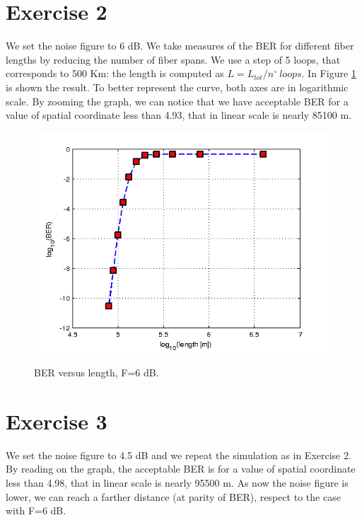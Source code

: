 \documentclass[a4paper,10pt]{report}
\begin{document}
\newpage
\section*{Exercise 2}
We set the noise figure to 6 dB. We take measures of the BER for different fiber lengths by reducing the number of fiber spans.
We use a step of 5 loops, that corresponds to 500 Km: the length is computed as $L=L_{tot}/n^\circ \ loops$.
In Figure \ref{es2} is shown the result. To better represent the curve, both axes are in logarithmic scale.
By zooming the graph, we can notice that we have acceptable BER for a value of spatial coordinate less than 4.93,
that in linear scale is nearly 85100 m.

\begin{figure}[!ht]
   \centering
   \includegraphics[width=11cm]{es2.png}\\
   \caption{BER versus length, F=6 dB.}
   \label{es2}
\end{figure}

\section*{Exercise 3}
We set the noise figure to 4.5 dB and we repeat the simulation as in Exercise 2.
By reading on the graph, the acceptable BER is for a value of spatial coordinate less than 4.98, that in linear scale is nearly 95500 m.
As now the noise figure is lower, we can reach a farther distance (at parity of BER), respect to the case with F=6 dB.
\end{document}
